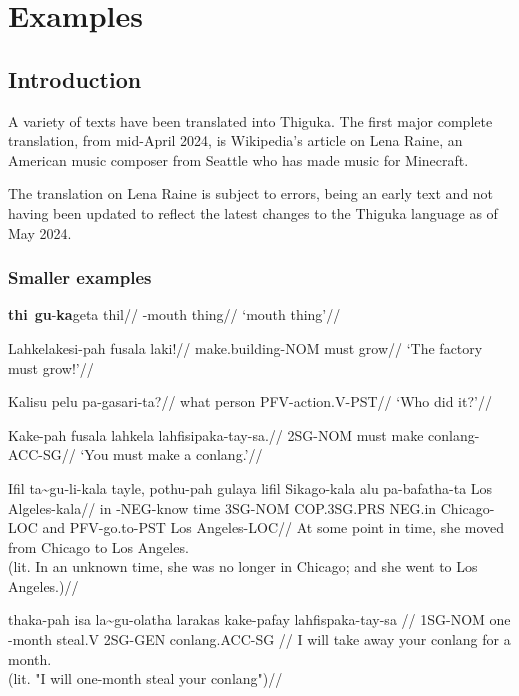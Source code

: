 
\part{Examples}
\chapter{Introduction}
A variety of texts have been translated into Thiguka. The first major complete translation, from mid-April 2024, is Wikipedia's article on Lena Raine, an American music composer from Seattle who has made music for Minecraft.

The translation on Lena Raine is subject to errors, being an early text and not having been updated to reflect the latest changes to the Thiguka language as of May 2024.

\section{Smaller examples}
\ex
\begingl
    \gla \textbf{thi}~\textbf{gu}-\textbf{ka}geta thil//
    \glb \agradj{}-mouth thing//
    \glft `mouth thing'//
\endgl
\xe

\ex
\begingl
    \gla Lahkelakesi-pah fusala laki!//
    \glb make.building-NOM must grow//
    \glft `The factory must grow!'//
\endgl
\xe

\ex
\begingl
    \gla Kalisu pelu pa-gasari-ta?//
    \glb what person PFV-action.V-PST//
    \glft `Who did it?'//
\endgl
\xe

\ex
\begingl
    \gla Kake-pah fusala lahkela lahfisipaka-tay-sa.//
    \glb 2SG-NOM must make conlang-ACC-SG//
    \glft `You must make a conlang.'//
\endgl
\xe

\ex
\begingl
    \gla Ifil ta\~{}gu-li-kala    tayle, pothu-pah gulaya      lifil  Sikago-kala alu pa-bafatha-ta Los Algeles-kala//
    \glb in   \agradj{}-NEG-know time   3SG-NOM   COP.3SG.PRS NEG.in Chicago-LOC and PFV-go.to-PST Los Angeles-LOC//
    \glft At some point in time, she moved from Chicago to Los Angeles.\\
          (lit. In an unknown time, she was no longer in Chicago; and she went to Los Angeles.)//
\endgl
\xe

\ex
\begingl
    \gla  thaka-pah isa la\~{}gu-olatha  larakas kake-pafay lahfispaka-tay-sa //
    \glb  1SG-NOM   one \agradj{}-month steal.V 2SG-GEN    conlang.ACC-SG //
    \glft I will take away your conlang for a month.\\
          (lit. "I will one-month steal your conlang")//
\endgl
\xe

